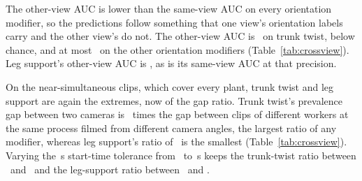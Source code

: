 \documentclass[review,3p,authoryear]{elsarticle}
\begin{document}
The other-view AUC is lower than the same-view AUC on every orientation modifier, so the
predictions follow something that one view's orientation labels carry and the other
view's do not. The other-view AUC is
\otherAucTrunkTwist\ on trunk twist, below chance, and at most \otherAucOrientMax\ on the
other orientation modifiers (Table~\ref{tab:crossview}). Leg support's other-view AUC is
\otherAucLegsSupport, as is its same-view AUC at that precision.

On the near-simultaneous clips, which cover every plant, trunk twist and leg support are
again the extremes, now of the gap ratio. Trunk twist's prevalence gap between two cameras
is \gapRatioTrunkTwist\ times the gap between clips of different workers at the same process filmed from different camera
angles, the largest ratio
of any modifier, whereas leg support's ratio of \gapRatioLegsSupport\ is the smallest
(Table~\ref{tab:crossview}). Varying the \takePairDt\,s start-time tolerance from
\takePairDtLo\ to \takePairDtHi\,s keeps the trunk-twist ratio between
\gapRatioSensLoTrunkTwist\ and \gapRatioSensHiTrunkTwist\ and the leg-support ratio
between \gapRatioSensLoLegsSupport\ and \gapRatioSensHiLegsSupport.
\end{document}

